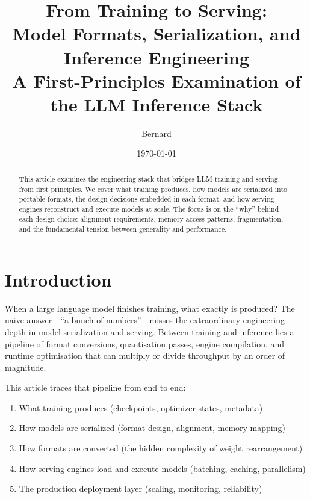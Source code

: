 \documentclass[11pt,a4paper]{article}
\theoremstyle{definition}
\begin{document}
\title{\Huge\textbf{From Training to Serving: \\ Model Formats, Serialization, and Inference Engineering}\\[0.5cm]
	\large A First-Principles Examination of the LLM Inference Stack}
\author{Bernard}
\date{\today}
\maketitle
\thispagestyle{empty}

\begin{abstract}
	This article examines the engineering stack that bridges LLM training and serving, from first principles. We cover what training produces, how models are serialized into portable formats, the design decisions embedded in each format, and how serving engines reconstruct and execute models at scale. The focus is on the ``why'' behind each design choice: alignment requirements, memory access patterns, fragmentation, and the fundamental tension between generality and performance.
\end{abstract}

\newpage
\tableofcontents
\newpage

\section{Introduction}
\label{sec:intro}

When a large language model finishes training, what exactly is produced? The naive answer---``a bunch of numbers''---misses the extraordinary engineering depth in model serialization and serving. Between training and inference lies a pipeline of format conversions, quantisation passes, engine compilation, and runtime optimisation that can multiply or divide throughput by an order of magnitude.

This article traces that pipeline from end to end:

\begin{enumerate}
	\item What training produces (checkpoints, optimizer states, metadata)
	\item How models are serialized (format design, alignment, memory mapping)
	\item How formats are converted (the hidden complexity of weight rearrangement)
	\item How serving engines load and execute models (batching, caching, parallelism)
	\item The production deployment layer (scaling, monitoring, reliability)
\end{enumerate}
\end{document}
